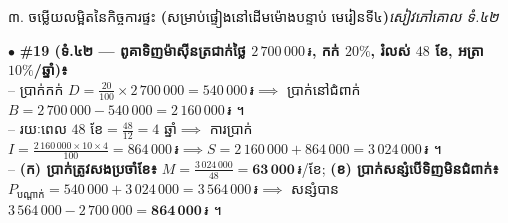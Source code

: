 \documentclass[a4paper,10pt]{article}
\newcommand{\enbf}[1]{{\TimesEn\bfseries #1}}
\newcommand{\riel}{\,\text{៛}}
\newcommand{\secstrip}[2]{%
  \vspace{3pt}%
  \begin{tcolorbox}[
    enhanced, sharp corners, colback=panelgray, colframe=black,
    boxrule=0.8pt, boxsep=0.8pt, top=2pt, bottom=2pt, left=5pt, right=5pt,
    after skip=3pt
  ]
    {\muol\fontsize{8.5pt}{12.2pt}\selectfont #1}\hfill{\fontsize{7.8pt}{10.8pt}\selectfont\textit{#2}}
  \end{tcolorbox}%
}
\begin{document}
\vspace{4pt}
\secstrip{៣. ចម្លើយលម្អិតនៃកិច្ចការផ្ទះ \enbf{(}សម្រាប់ផ្ទៀងនៅដើមម៉ោងបន្ទាប់ មេរៀនទី៤\enbf{)}}{សៀវភៅគោល ទំ.៤២}

\begin{tcolorbox}[
  enhanced, sharp corners, colback=white, colframe=black,
  boxrule=0.8pt, boxsep=2pt, top=4pt, bottom=4pt, left=6pt, right=6pt
]
  \fontsize{8.9pt}{13.4pt}\selectfont
  $\bullet$ \textbf{\#19 (ទំ.៤២ — ពូគាទិញម៉ាស៊ីនត្រជាក់ថ្លៃ $2\,700\,000\riel$, កក់ $20\%$, រំលស់ $48$ ខែ, អត្រា $10\%$/ឆ្នាំ)៖}\\[2pt]
  \hspace*{0.3cm}-- ប្រាក់កក់ $D = \frac{20}{100}\times 2\,700\,000 = 540\,000\riel \implies$ ប្រាក់នៅជំពាក់ $B = 2\,700\,000 - 540\,000 = 2\,160\,000\riel$ ។\\[2pt]
  \hspace*{0.3cm}-- រយៈពេល $48\text{ ខែ} = \frac{48}{12} = 4\text{ ឆ្នាំ} \implies$ ការប្រាក់ $I = \frac{2\,160\,000\times 10\times 4}{100} = 864\,000\riel \implies S = 2\,160\,000 + 864\,000 = 3\,024\,000\riel$ ។\\[2pt]
  \hspace*{0.3cm}-- \textbf{(ក) ប្រាក់ត្រូវសងប្រចាំខែ៖} $M = \frac{3\,024\,000}{48} = \mathbf{63\,000\riel}$/ខែ; \quad \textbf{(ខ) ប្រាក់សន្សំបើទិញមិនជំពាក់៖} $P_{\text{បណ្ដាក់}} = 540\,000 + 3\,024\,000 = 3\,564\,000\riel \implies$ សន្សំបាន $3\,564\,000 - 2\,700\,000 = \mathbf{864\,000\riel}$ ។
\end{tcolorbox}
\end{document}
